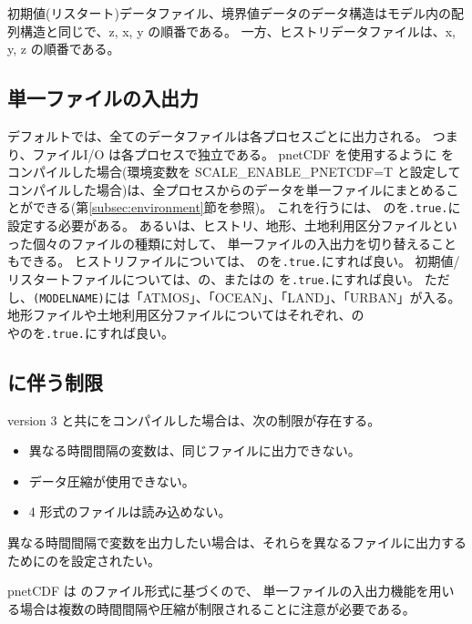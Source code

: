 初期値(リスタート)データファイル、境界値データのデータ構造はモデル内の配列構造と同じで、z, x, y の順番である。
一方、ヒストリデータファイルは、x, y, z の順番である。

\subsection{単一ファイルの入出力} \label{subsec:single_io}
デフォルトでは、全てのデータファイルは各プロセスごとに出力される。
つまり、ファイルI/O は各プロセスで独立である。
pnetCDF を使用するように \scalerm をコンパイルした場合(環境変数を SCALE\_ENABLE\_PNETCDF=T と設定してコンパイルした場合)は、全プロセスからのデータを単一ファイルにまとめることができる(第\ref{subsec:environment}節を参照)。
これを行うには、 のを\verb|.true.|に設定する必要がある。
あるいは、ヒストリ、地形、土地利用区分ファイルといった個々のファイルの種類に対して、
単一ファイルの入出力を切り替えることもできる。
ヒストリファイルについては、 のを\verb|.true.|にすれば良い。
初期値/リスタートファイルについては、の、またはの
を\verb|.true.|にすれば良い。
ただし、\verb|(MODELNAME)|には「ATMOS」、「OCEAN」、「LAND」、「URBAN」が入る。
地形ファイルや土地利用区分ファイルについてはそれぞれ、の\\やのを\verb|.true.|にすれば良い。

\subsection{ に伴う制限}
{\netcdf} version 3 と共に\scale をコンパイルした場合は、次の制限が存在する。
\begin{itemize}
\item 異なる時間間隔の変数は、同じファイルに出力できない。
\item データ圧縮が使用できない。
\item {\netcdf}4 形式のファイルは読み込めない。
\end{itemize}
異なる時間間隔で変数を出力したい場合は、それらを異なるファイルに出力するためにのを設定されたい。

pnetCDF は  のファイル形式に基づくので、
単一ファイルの入出力機能を用いる場合は複数の時間間隔や圧縮が制限されることに注意が必要である。

